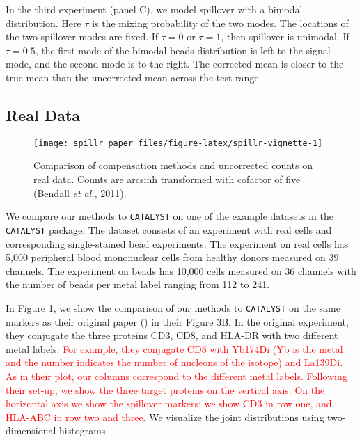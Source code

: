 \documentclass[
]{article}
\begin{document}
In the third experiment (panel C), we model spillover with a bimodal distribution. Here \(\tau\) is the mixing probability of the two modes. The locations of the two spillover modes are fixed. If \(\tau = 0\) or \(\tau = 1\), then spillover is unimodal. If \(\tau = 0.5\), the first mode of the bimodal beads distribution is left to the signal mode, and the second mode is to the right. The corrected mean is closer to the true mean than the uncorrected mean across the test range.

\subsection{Real Data}\label{real-data}

\begin{figure}

{\centering \texttt{[image: spillr\_paper\_files/figure-latex/spillr-vignette-1]} 

}

\caption{Comparison of compensation methods and uncorrected counts on real data. Counts are arcsinh transformed with cofactor of five (\protect\hyperlink{ref-bendall2011single}{Bendall \emph{et al.}, 2011}).}\label{fig:spillr-vignette}
\end{figure}

We compare our methods to \texttt{CATALYST} on one of the example datasets in the \texttt{CATALYST} package. The dataset consists of an experiment with real cells and corresponding single-stained bead experiments. The experiment on real cells has 5,000 peripheral blood mononuclear cells from healthy donors measured on 39 channels. The experiment on beads has 10,000 cells measured on 36 channels with the number of beads per metal label ranging from 112 to 241.

In Figure \ref{fig:spillr-vignette}, we show the comparison of our methods to \texttt{CATALYST} on the same markers as their original paper () in their Figure 3B. In the original experiment, they conjugate the three proteins CD3, CD8, and HLA-DR with two different metal labels.
\textcolor{red}{
For example, they conjugate CD8 with Yb174Di (Yb is the metal and the number indicates the number of nucleons of the isotope) and La139Di. 
As in their plot, our columns correspond to the different metal labels.
Following their set-up, we show the three target proteins on the vertical axis.
On the horizontal axis we show the spillover markers; we show CD3 in row one, and HLA-ABC in row two and three.
}
We visualize the joint distributions using two-dimensional histograms.
\end{document}
